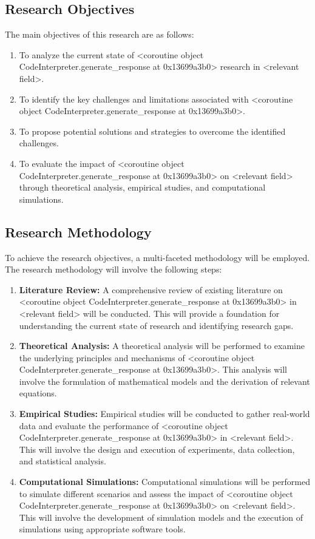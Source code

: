 \documentclass{article}
\begin{document}
\subsection{Research Objectives}
The main objectives of this research are as follows:
\begin{enumerate}
    \item To analyze the current state of <coroutine object CodeInterpreter.generate_response at 0x13699a3b0> research in <relevant field>.
    \item To identify the key challenges and limitations associated with <coroutine object CodeInterpreter.generate_response at 0x13699a3b0>.
    \item To propose potential solutions and strategies to overcome the identified challenges.
    \item To evaluate the impact of <coroutine object CodeInterpreter.generate_response at 0x13699a3b0> on <relevant field> through theoretical analysis, empirical studies, and computational simulations.
\end{enumerate}

\subsection{Research Methodology}
To achieve the research objectives, a multi-faceted methodology will be employed. The research methodology will involve the following steps:

\begin{enumerate}
    \item \textbf{Literature Review:} A comprehensive review of existing literature on <coroutine object CodeInterpreter.generate_response at 0x13699a3b0> in <relevant field> will be conducted. This will provide a foundation for understanding the current state of research and identifying research gaps.
    \item \textbf{Theoretical Analysis:} A theoretical analysis will be performed to examine the underlying principles and mechanisms of <coroutine object CodeInterpreter.generate_response at 0x13699a3b0>. This analysis will involve the formulation of mathematical models and the derivation of relevant equations.
    \item \textbf{Empirical Studies:} Empirical studies will be conducted to gather real-world data and evaluate the performance of <coroutine object CodeInterpreter.generate_response at 0x13699a3b0> in <relevant field>. This will involve the design and execution of experiments, data collection, and statistical analysis.
    \item \textbf{Computational Simulations:} Computational simulations will be performed to simulate different scenarios and assess the impact of <coroutine object CodeInterpreter.generate_response at 0x13699a3b0> on <relevant field>. This will involve the development of simulation models and the execution of simulations using appropriate software tools.
\end{enumerate}
\end{document}
